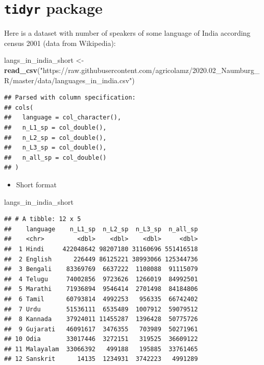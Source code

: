 \documentclass[
]{book}
\newenvironment{Shaded}{\begin{snugshade}}{\end{snugshade}}
\newcommand{\KeywordTok}[1]{\textcolor[rgb]{0.13,0.29,0.53}{\textbf{#1}}}
\newcommand{\NormalTok}[1]{#1}
\newcommand{\StringTok}[1]{\textcolor[rgb]{0.31,0.60,0.02}{#1}}
\providecommand{\tightlist}{%
  \setlength{\itemsep}{0pt}\setlength{\parskip}{0pt}}
\begin{document}
\hypertarget{tidyr-package}{%
\section{\texorpdfstring{\texttt{tidyr} package}{tidyr package}}\label{tidyr-package}}

Here is a dataset with number of speakers of some language of India according census 2001 (data from Wikipedia):

\begin{Shaded}
\begin{Highlighting}[]
\NormalTok{langs_in_india_short <-}\StringTok{ }\KeywordTok{read_csv}\NormalTok{(}\StringTok{"https://raw.githubusercontent.com/agricolamz/2020.02_Naumburg_R/master/data/languages_in_india.csv"}\NormalTok{)}
\end{Highlighting}
\end{Shaded}

\begin{verbatim}
## Parsed with column specification:
## cols(
##   language = col_character(),
##   n_L1_sp = col_double(),
##   n_L2_sp = col_double(),
##   n_L3_sp = col_double(),
##   n_all_sp = col_double()
## )
\end{verbatim}

\begin{itemize}
\tightlist
\item
  Short format
\end{itemize}

\begin{Shaded}
\begin{Highlighting}[]
\NormalTok{langs_in_india_short}
\end{Highlighting}
\end{Shaded}

\begin{verbatim}
## # A tibble: 12 x 5
##    language    n_L1_sp  n_L2_sp  n_L3_sp  n_all_sp
##    <chr>         <dbl>    <dbl>    <dbl>     <dbl>
##  1 Hindi     422048642 98207180 31160696 551416518
##  2 English      226449 86125221 38993066 125344736
##  3 Bengali    83369769  6637222  1108088  91115079
##  4 Telugu     74002856  9723626  1266019  84992501
##  5 Marathi    71936894  9546414  2701498  84184806
##  6 Tamil      60793814  4992253   956335  66742402
##  7 Urdu       51536111  6535489  1007912  59079512
##  8 Kannada    37924011 11455287  1396428  50775726
##  9 Gujarati   46091617  3476355   703989  50271961
## 10 Odia       33017446  3272151   319525  36609122
## 11 Malayalam  33066392   499188   195885  33761465
## 12 Sanskrit      14135  1234931  3742223   4991289
\end{verbatim}
\end{document}
